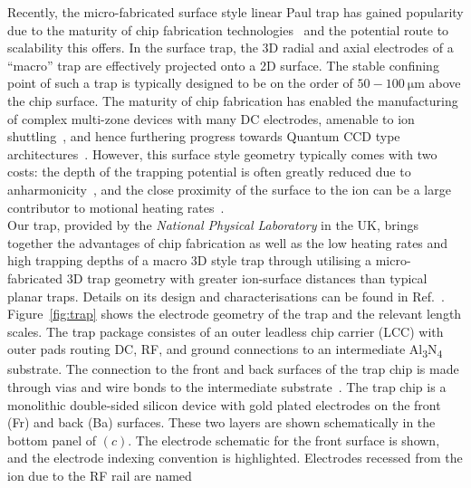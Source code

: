     Recently, the micro-fabricated surface style linear Paul trap has gained
    popularity due to the maturity of chip fabrication
    technologies~\cite{allcock_surface-electrode_2011} and the potential route
    to scalability this offers. In the surface trap, the 3D radial and axial
    electrodes of a ``macro'' trap are effectively projected onto a 2D surface.
    The stable confining point of such a trap is typically designed to be on the order of $50-100~\unit{\micro\meter}$
    above the chip surface. The maturity of chip fabrication has enabled
    the manufacturing of complex multi-zone devices with many DC electrodes, amenable to ion shuttling~\cite{kaushal_shuttling-based_2020, sterk_closed-loop_2022}, and hence furthering progress towards Quantum CCD
    type architectures~\cite{kielpinski_architecture_2002}. However, this
    surface style geometry typically comes with two costs: the depth of the
    trapping potential is often greatly reduced due to anharmonicity~\cite{home_normal_2011}, and the close proximity of the
    surface to the ion can be a large contributor to motional heating
    rates~\cite{wineland_experimental_1998, turchette_heating_2000, brownnutt_ion-trap_2015, boldin_measuring_2018}. \\
    Our trap, provided by the \emph{National Physical Laboratory} in the UK,
    brings together the
    advantages of chip fabrication as well as the low heating rates and high
    trapping depths of a macro 3D style trap
    through utilising a micro-fabricated 3D trap geometry with greater ion-surface distances than typical planar traps.
    Details on its design and characterisations can be found in Ref.~\cite{see_fabrication_2013,
    wilpers_monolithic_2012, choonee_silicon_2017}. Figure~\ref{fig:trap} shows the electrode geometry of the trap and the relevant length scales.
    The trap package consistes of an outer leadless chip carrier (LCC) with outer
    pads routing DC, RF, and ground connections to an intermediate
    Al\textsubscript{3}N\textsubscript{4} substrate. The connection to the front
    and back surfaces of the trap chip is made through vias and wire bonds to
    the intermediate substrate~\cite{wilpers_compact_2013}. The trap chip 
    is a monolithic double-sided silicon device with gold plated electrodes on
    the front (Fr) and back (Ba) surfaces. These two layers are shown
    schematically in the bottom panel of $(c)$. The electrode schematic for the
    front surface is shown, and the electrode indexing convention is
    highlighted. Electrodes recessed from the ion due to the RF rail are named
